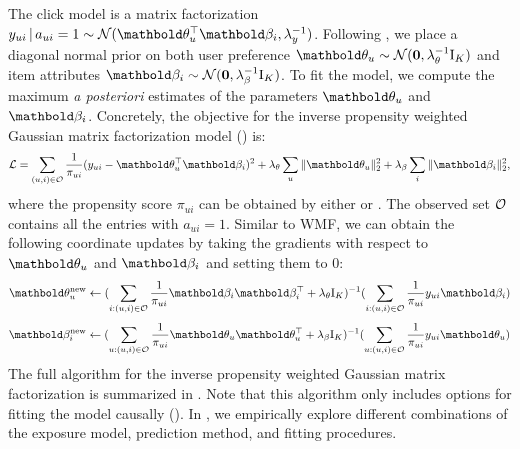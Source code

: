 The click model is a matrix factorization $y_{ui} \g a_{ui} = 1 \sim \cN(\mb\theta_u^\top \mb\beta_i, \lambda_y^{-1})$.
Following , we place a diagonal normal prior on both user preference
$\mb\theta_u \sim \mathcal{N}(\bzero, \lambda_\theta^{-1} \mathrm{I}_K)$ and
item attributes
$\mb\beta_i \sim \mathcal{N}(\bzero, \lambda_\beta^{-1}\mathrm{I}_K)$. To fit the model, we compute the maximum \emph{a posteriori} estimates of the parameters $\mb\theta_u$ and $\mb\beta_i$. Concretely, the objective for the inverse propensity weighted Gaussian matrix factorization model () is:
\begin{equation*}
\cL = \sum_{(u, i)\in \cO} \frac{1}{\pi_{ui}}(y_{ui} - \mb\theta_u^\top\mb\beta_i)^2 + \lambda_\theta \sum_u \|\mb\theta_u \|^2_2 + \lambda_\beta \sum_i \|\mb\beta_i \|_2^2,
\label{chpt:causal_rec:eq:gmf_logll}
\end{equation*}
where the propensity score $\pi_{ui}$ can be obtained by either  or . The observed set $\mathcal{O}$ contains all the entries with $a_{ui} = 1$. Similar to \gls{WMF}, we can obtain the following coordinate updates by taking the gradients with respect to $\mb\theta_u$ and $\mb\beta_i$ and setting them to 0:
\begin{equation}
\mb\theta_u^\new \leftarrow (\sum_{i: (u, i) \in \cO} \frac{1}{\pi_{ui}}\mb\beta_i \mb\beta_i^\top + \lambda_\theta \mathrm{I}_K)^{-1} (\sum_{i: (u, i) \in \cO} \frac{1}{\pi_{ui}} y_{ui} \mb\beta_i)
\label{chpt:causal_rec:eq:als_user}
\end{equation}
\begin{equation}
\mb\beta_i^\new \leftarrow (\sum_{u: (u, i)\in\cO} \frac{1}{\pi_{ui}}\mb\theta_u \mb\theta_u^\top + \lambda_\beta \mathrm{I}_K)^{-1} (\sum_{u: (u, i)\in\cO} \frac{1}{\pi_{ui}}y_{ui} \mb\theta_u)
\label{chpt:causal_rec:eq:als_item}
\end{equation}
The full algorithm for the inverse propensity weighted Gaussian matrix factorization is summarized in . Note that this algorithm only includes options for fitting the model causally (). In , we empirically explore different combinations of the exposure model, prediction method, and fitting procedures.

